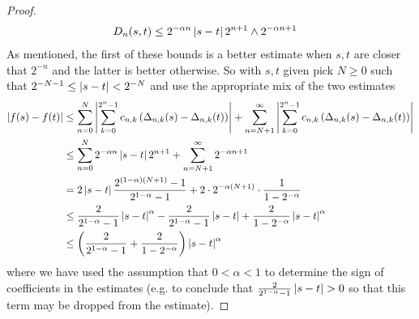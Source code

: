 \begin{proof}
\begin{align*}
D_n(s,t) &\leq 2^{-\alpha  n} \left \vert s-t \right \vert 2^{n+1} \wedge 2^{-\alpha n + 1}
\end{align*}
As mentioned, the first of these bounds is a better estimate when $s,t$ are closer
that $2^{-n}$ and the latter is better otherwise.  So with $s,t$
given pick $N \geq 0$ such that $2^{-N -1} \leq \left \vert s -t \right \vert < 2^{-N}$
and use the appropriate mix of the two estimates
\begin{align*}
\left \vert f(s) - f(t) \right \vert &\leq \sum_{n=0}^N \left \vert \sum_{k=0}^{2^n -1}
  c_{n,k} \left ( \Delta_{n,k}(s) - \Delta_{n,k}(t) \right)  \right \vert + \sum_{n=N+1}^\infty \left \vert \sum_{k=0}^{2^n -1}
  c_{n,k} \left ( \Delta_{n,k}(s) - \Delta_{n,k}(t) \right)  \right \vert \\
&\leq \sum_{n=0}^N 2^{-\alpha  n} \left \vert s-t \right \vert 2^{n+1} + 
\sum_{n=N+1}^\infty 2^{-\alpha n + 1} \\
&= 2 \left \vert s - t \right \vert \frac{2^{(1 -\alpha)(N+1)} - 1}{2^{1 - \alpha} -1} + 2 \cdot 2^{-\alpha(N+1)} \cdot \frac{1}{1 - 2^{-\alpha}} \\
&\leq \frac{2}{2^{1 - \alpha} -1} \left \vert s-t \right \vert^\alpha - \frac{2}{2^{1 -
    \alpha} -1}\left \vert s-t \right \vert + \frac{2}{1 - 2^{-\alpha}} \left \vert s - t \right \vert^\alpha \\
&\leq \left( \frac{2}{2^{1 - \alpha} -1} + \frac{2}{1 - 2^{-\alpha}}
\right ) \left \vert s-t \right \vert^\alpha
\end{align*}
where we have used the assumption that $0 < \alpha < 1$ to determine
the sign of coefficients in the estimates (e.g. to conclude
that $\frac{2}{2^{1 - \alpha} -1}\left \vert s-t \right \vert > 0$ so that this term may
be dropped from the estimate).
\end{proof}

